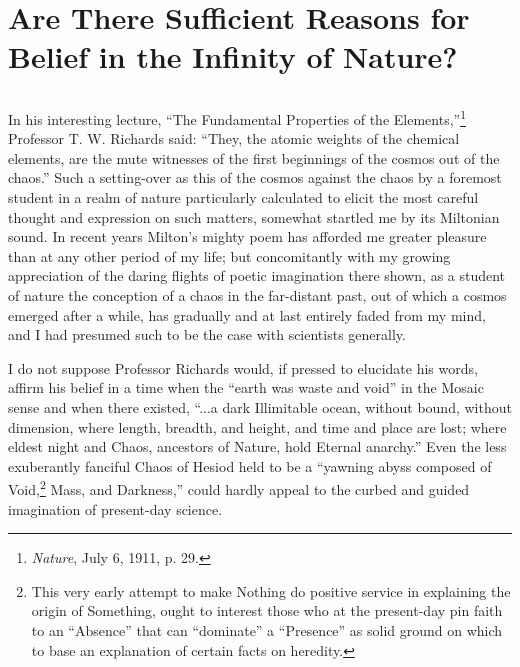 \documentclass[a4paper, 11pt, oneside, polutonikogreek, english]{article}
\begin{document}
\section{Are There Sufficient Reasons for Belief in the Infinity of Nature?}
\subsection{}
\paragraph{}
In his interesting lecture, ``The Fundamental Properties of the Elements,''\footnote{\emph{Nature}, July 6, 1911, p. 29.} Professor T. W. Richards said: ``They, the atomic weights of the chemical elements, are the mute witnesses of the first beginnings of the cosmos out of the chaos.'' Such a setting-over as this of the cosmos against the chaos by a foremost student in a realm of nature particularly calculated to elicit the most careful thought and expression on such matters, somewhat startled me by its Miltonian sound. In recent years Milton's mighty poem has afforded me greater pleasure than at any other period of my life; but concomitantly with my growing appreciation of the daring flights of poetic imagination there shown, as a student of nature the conception of a chaos in the far-distant past, out of which a cosmos emerged after a while, has gradually and at last entirely faded from my mind, and I had presumed such to be the case with scientists generally.

I do not suppose Professor Richards would, if pressed to elucidate his words, affirm his belief in a time when the ``earth was waste and void'' in the Mosaic sense and when there existed, ``...a dark Illimitable ocean, without bound, without dimension, where length, breadth, and height, and time and place are lost; where eldest night and Chaos, ancestors of Nature, hold Eternal anarchy.'' Even the less exuberantly fanciful Chaos of Hesiod held to be a ``yawning abyss composed of Void,\footnote{This very early attempt to make Nothing do positive service in explaining the origin of Something, ought to interest those who at the present-day pin faith to an ``Absence'' that can ``dominate'' a ``Presence'' as solid ground on which to base an explanation of certain facts on heredity.} Mass, and Darkness,'' could hardly appeal to the curbed and guided imagination of present-day science.
\end{document}
